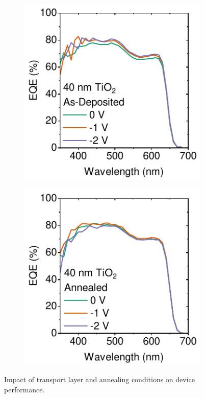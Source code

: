 \begin{figure}[htbp]
    \begin{subfigure}[t]{0.4\textwidth}
        \centering
        \includegraphics[width=\textwidth]{chapters/material_properties/images/As_Dep-EQE.pdf} %
        \caption{}
        \label{fig:ch2:as_dep_eqe}
    \end{subfigure}
    \hfill
    \begin{subfigure}[t]{0.4\textwidth}
        \centering
        \includegraphics[width=\textwidth]{chapters/material_properties/images/Annealed_EQE.pdf} %
        \caption{}
        \label{fig:ch2:annealed_eqe}
    \end{subfigure}
    \caption{Impact of transport layer and annealing conditions on device performance.}
\end{figure}

